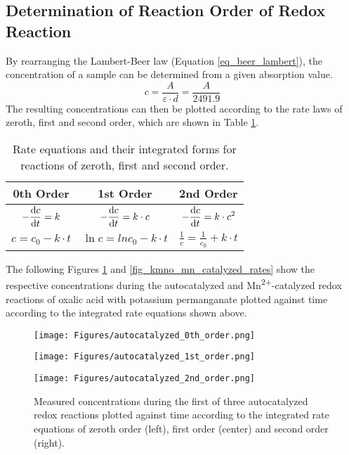 \documentclass[titlepage]{article}
\begin{document}
\subsection{Determination of Reaction Order of Redox Reaction}
By rearranging the Lambert-Beer law (Equation \ref{eq_beer_lambert}), the concentration of a sample can be determined from a given absorption value.
%
\begin{equation} \label{eq_concentration_from_attenuation}
    c = \frac{A}{\varepsilon \cdot d} = \frac{A}{2491.9}
\end{equation}
%
The resulting concentrations can then be plotted according to the rate laws of zeroth, first and second order, which are shown in Table \ref{tb_rate_laws}.
%
\begin{table}[H]
    \centering
    \caption{Rate equations and their integrated forms for reactions of zeroth, first and second order.}
    \label{tb_rate_laws}
    \begin{tabular}{|c|c|c|}
        \hline
        \textbf{0th Order} & \textbf{1st Order} & \textbf{2nd Order}
        \\
        \hline
        \(\displaystyle -\odv{c}{t} = k\) & \(\displaystyle -\odv{c}{t} = k \cdot c\) & \(\displaystyle -\odv{c}{t} = k \cdot c^2\)
        \\
        \hline
        \(\displaystyle c = c_0 - k \cdot t\) & \(\displaystyle \ln{c} = ln{c_0} - k \cdot t\) & \(\displaystyle \frac{1}{c} = \frac{1}{c_0} + k \cdot t\)
        \\
        \hline
    \end{tabular}
\end{table}
%
\noindent The following Figures \ref{fig_kmno_autocatalyzed_rates} and \ref{fig_kmno_mn_catalyzed_rates} show the respective concentrations during the autocatalyzed and Mn\textsuperscript{2+}-catalyzed redox reactions of oxalic acid with potassium permanganate plotted against time according to the integrated rate equations shown above.
%
\begin{figure}[H]
    \centering
    \begin{minipage}[c]{0.32\textwidth}
        \texttt{[image: Figures/autocatalyzed\_0th\_order.png]}
    \end{minipage}
    \begin{minipage}[c]{0.32\textwidth}
        \texttt{[image: Figures/autocatalyzed\_1st\_order.png]}
    \end{minipage}
    \begin{minipage}[c]{0.32\textwidth}
        \texttt{[image: Figures/autocatalyzed\_2nd\_order.png]}
    \end{minipage}
    \caption{Measured concentrations during the first of three autocatalyzed redox reactions plotted against time according to the integrated rate equations of zeroth order (left), first order (center) and second order (right).}
    \label{fig_kmno_autocatalyzed_rates}
\end{figure}
\end{document}
